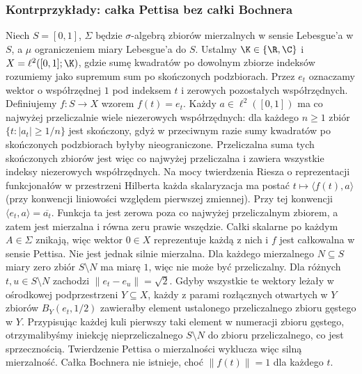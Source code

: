 \subsubsection{Kontrprzykłady: całka Pettisa bez całki Bochnera}

\begin{przyklad}
\label{ex:pettis-not-bochner15b}
Niech $S=[0,1]$, $\Sigma$ będzie $\sigma$-algebrą zbiorów
mierzalnych w sensie Lebesgue'a w $S$, a $\mu$ ograniczeniem
miary Lebesgue'a do $S$. Ustalmy $\K\in\{\R,\C\}$ i
$X=\ell^2([0,1];\K)$, gdzie sumę kwadratów po dowolnym
zbiorze indeksów rozumiemy jako supremum sum po skończonych
podzbiorach. Przez $e_t$ oznaczamy wektor o współrzędnej
$1$ pod indeksem $t$ i zerowych pozostałych współrzędnych.
Definiujemy $f:S\to X$ wzorem $f(t)=e_t$.
Każdy $a\in\ell^2([0,1])$ ma co najwyżej przeliczalnie
wiele niezerowych współrzędnych: dla każdego $n\ge1$
zbiór $\{t:|a_t|\ge 1/n\}$ jest skończony, gdyż w przeciwnym
razie sumy kwadratów po skończonych podzbiorach byłyby
nieograniczone. Przeliczalna suma tych skończonych zbiorów jest więc
co najwyżej przeliczalna i zawiera wszystkie indeksy
niezerowych współrzędnych. Na mocy twierdzenia Riesza o
reprezentacji funkcjonałów w przestrzeni Hilberta każda
skalaryzacja ma postać $t\mapsto\langle f(t),a\rangle$
(przy konwencji liniowości względem pierwszej zmiennej).
Przy tej konwencji $\langle e_t,a\rangle=\overline{a_t}$.
Funkcja ta jest zerowa poza co najwyżej przeliczalnym
zbiorem, a zatem jest mierzalna i równa zeru prawie
wszędzie. Całki skalarne po każdym $A\in\Sigma$ znikają,
więc wektor $0\in X$ reprezentuje każdą z nich i $f$
jest całkowalna w sensie Pettisa.
Nie jest jednak silnie mierzalna. Dla każdego mierzalnego
$N\subseteq S$ miary zero zbiór $S\setminus N$ ma miarę $1$,
więc nie może być przeliczalny. Dla różnych $t,u\in S\setminus N$
zachodzi $\|e_t-e_u\|=\sqrt{2}$. Gdyby wszystkie te wektory
leżały w ośrodkowej podprzestrzeni $Y\subseteq X$, każdy
z parami rozłącznych otwartych w $Y$ zbiorów
$B_Y(e_t,1/2)$ zawierałby element ustalonego przeliczalnego
zbioru gęstego w $Y$. Przypisując każdej kuli pierwszy
taki element w numeracji zbioru gęstego, otrzymalibyśmy
iniekcję nieprzeliczalnego $S\setminus N$ do zbioru
przeliczalnego, co jest sprzecznością. Twierdzenie
Pettisa o mierzalności wyklucza więc silną mierzalność. Całka Bochnera nie istnieje,
choć $\|f(t)\|=1$ dla każdego $t$.
\end{przyklad}

